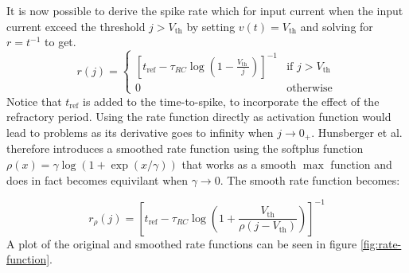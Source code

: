 \documentclass[a4paper,11pt]{article} %
\begin{document}
It is now possible to derive the spike rate which for input current 
when the input current exceed the threshold $j>V_\text{th}$ by setting $v(t) = V_\text{th}$ and solving for $r = t^{-1}$ to get.
\begin{equation}
  r(j) = \begin{cases} 
      \left[t_\text{ref} - \tau_{RC} \log \left(1-\frac{V_{\text {th }}}{j}\right) \right]^{-1} & \text{if } j > V_\text{th} \\
      0 & \text{otherwise}
  \end{cases}
\end{equation}
Notice that $t_\text{ref}$ is added to the time-to-spike, to incorporate the effect of the refractory period. Using the rate function directly as activation function would lead to problems as its derivative goes to infinity when $j \to 0_{+}$. Hunsberger et al. therefore introduces a smoothed rate function using the softplus function $\rho(x) = \gamma \log(1 + \exp(x / \gamma))$ that works as a smooth $\max$ function and does in fact becomes equivilant when $\gamma \to 0$. The smooth rate function becomes:

\begin{equation} \label{eq:soft-rate}
  r_\rho(j) = \left[t_\text{ref} - \tau_{RC} \log \left(1 + \frac{ V_{\text{th}} }{ \rho(j - V_\text{th})}\right) \right]^{-1}
\end{equation}
A plot of the original and smoothed rate functions can be seen in figure \ref{fig:rate-function}.
\end{document}
